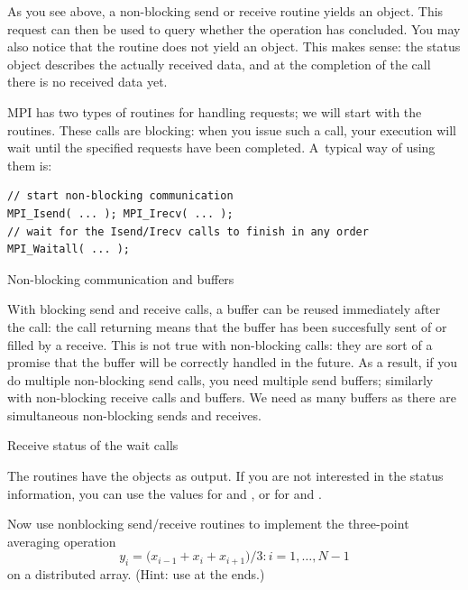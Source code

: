 As you see above, a non-blocking send or receive routine yields
an  object. This request can then be used to
query whether the operation has concluded. You may also notice that
the  routine does not 
yield an  object.
This makes sense: the status object
describes the actually received data, and at the completion of the
 call there is no received data yet.

MPI has two types of routines for handling requests; we will start
with the  routines. These
calls are blocking: when you issue
such a call, your execution will wait until the specified requests
have been completed. A~typical way of using them is:
\begin{lstlisting}
// start non-blocking communication
MPI_Isend( ... ); MPI_Irecv( ... );
// wait for the Isend/Irecv calls to finish in any order
MPI_Waitall( ... );
\end{lstlisting}


 {Non-blocking communication and buffers}

With blocking send and receive calls, a buffer can be reused
immediately after the call: the call returning means that the buffer
has been succesfully sent of or filled by a receive. This is not true
with non-blocking calls: they are sort of a promise that the buffer
will be correctly handled in the future. As a result, if you do
multiple non-blocking send calls, you need multiple send buffers;
similarly with non-blocking receive calls and buffers.
We need as many buffers as there are
simultaneous non-blocking sends and receives.
%

 {Receive status of the wait calls}

The  routines have the 
objects as output.
If you are not interested in
the status information, you can use the values
 for  and
,
or  for 
and .

\begin{exercise}
  \label{ex:3ptnonblock}
  Now use nonblocking send/receive routines to implement
  the three-point averaging operation
  \[ y_i=\bigl( x_{i-1}+x_i+x_{i+1} \bigr)/3\colon i=1,\ldots,N-1 \]
  on a distributed array. (Hint: use  at the ends.)
\end{exercise}


